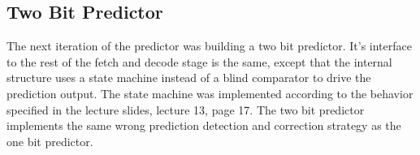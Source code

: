 \documentclass[12pt]{IEEEtran} %
\begin{document}
\subsection{Two Bit Predictor} %
\label{sub:2_bit_predictor}
The next iteration of the predictor was building a two bit predictor. It's interface to the rest of the fetch and decode stage is the same, except that the internal structure uses a state machine instead of a blind comparator to drive the prediction output. The state machine was implemented according to the behavior specified in the lecture slides, lecture 13, page 17. The two bit predictor implements the same wrong prediction detection and correction strategy as the one bit predictor.

\end{document}
